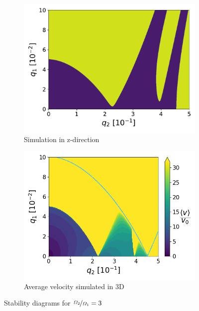 \begin{figure}[H]
\begin{subfigure}{.5\textwidth}
  \centering
  \includegraphics[width=\linewidth]{img/0_ions_1_electrons_q1_0.0-0.1_q2_0.0-0.5_992x992_3.pdf}
  \caption{Simulation in z-direction}
  \label{fig:sim_3_z-direction}
\end{subfigure}%
\begin{subfigure}{.5\textwidth}
  \centering
  \includegraphics[width=\linewidth]{img/det_q1_0.0-0.1_q2_0.0-0.5_970x970_3_1000.png}  
  \caption{Average velocity simulated in 3D}
  \label{fig:sim_3_x-y_edge}
\end{subfigure}
\caption{Stability diagrams for $\nicefrac{\Omega_2}{\Omega_1} = 3$}
\label{fig:stabil-eta=3 different directions}
\end{figure}


